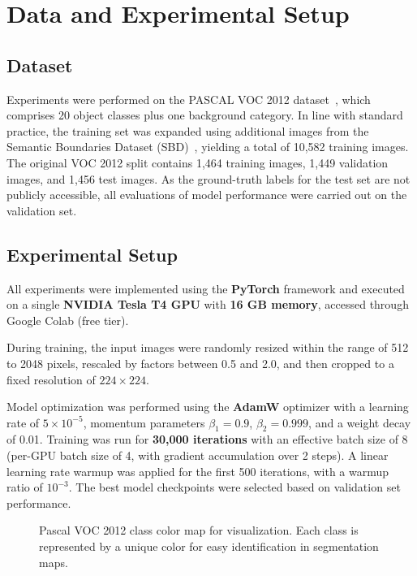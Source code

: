 \section{Data and Experimental Setup}
\label{sec:data_and_experimental_setup}

\subsection{Dataset}
\label{subsec:dataset}
Experiments were performed on the PASCAL VOC 2012 dataset~\cite{dataset_pascal_voc}, which comprises 20 object classes plus one background category. In line with standard practice, the training set was expanded using additional images from the Semantic Boundaries Dataset (SBD)~\cite{sbd_dataset}, yielding a total of 10,582 training images. The original VOC 2012 split contains 1,464 training images, 1,449 validation images, and 1,456 test images. As the ground-truth labels for the test set are not publicly accessible, all evaluations of model performance were carried out on the validation set.

\subsection{Experimental Setup}
\label{subsec:experimental_setup}
All experiments were implemented using the \textbf{PyTorch} framework and executed on a single \textbf{NVIDIA Tesla T4 GPU} with \textbf{16 GB memory}, accessed through Google Colab (free tier).

During training, the input images were randomly resized within the range of 512 to 2048 pixels, rescaled by factors between 0.5 and 2.0, and then cropped to a fixed resolution of $224 \times 224$.

Model optimization was performed using the \textbf{AdamW} optimizer with a learning rate of $5 \times 10^{-5}$, momentum parameters $\beta_1 = 0.9$, $\beta_2 = 0.999$, and a weight decay of 0.01. Training was run for \textbf{30,000 iterations} with an effective batch size of 8 (per-GPU batch size of 4, with gradient accumulation over 2 steps). A linear learning rate warmup was applied for the first 500 iterations, with a warmup ratio of $10^{-3}$. The best model checkpoints were selected based on validation set performance.

\begin{figure}[t]
    \centering
    \caption{Pascal VOC 2012 class color map for visualization. Each class is represented by a unique color for easy identification in segmentation maps.}
    \label{fig:class_colors_voc2012}
\end{figure}

